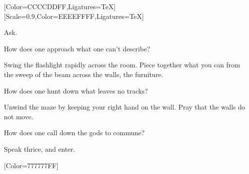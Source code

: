 \begin{paracol}{2}
  \begin{leftcolumn}


    [Color=CCCCDDFF,Ligatures=TeX]
    \renewfontfamily{}[Scale=0.9,Color=EEEEFFFF,Ligatures=TeX]

\null
\vfill
\begin{ally}
Ask.
\end{ally}
\vfill
\newpage

\noindent How does one approach what one can't describe?

\begin{ally}
Swing the flashlight rapidly across the room. Piece together what you can from the sweep of the beam across the walls, the furniture.
\end{ally}
How does one hunt down what leaves no tracks?

\begin{ally}
Unwind the maze by keeping your right hand on the wall. Pray that the walls do not move.
\end{ally}
How does one call down the gods to commune?

\begin{ally}
Speak thrice, and enter.
\end{ally}
\newpage
\end{leftcolumn}
\end{paracol}


\renewfontfamily{}[Color=777777FF]

